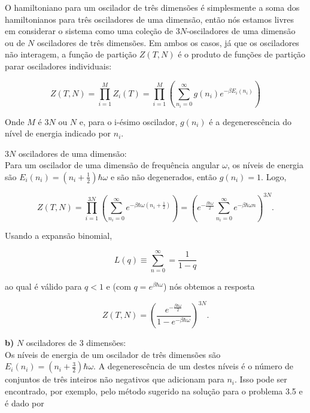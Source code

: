 \documentclass[12pt]{article}
\begin{document}
O hamiltoniano para um oscilador de três dimensões é simplesmente a soma dos hamiltonianos para três osciladores de uma dimensão, então nós estamos livres em considerar o sistema como uma coleção de $3N$-osciladores de uma dimensão ou de $N$ osciladores de três dimensões. Em ambos os casos, já que os osciladores não interagem, a função de partição $Z(T,N)$ é o produto de funções de partição parar osciladores individuais:

\begin{equation}
Z(T,N) = \prod_{i=1}^{M} Z_i(T) = \prod_{i=1}^{M} \left(\sum_{n_i = 0}^\infty g(n_i) e^{-\beta E_i(n_i)}\right)
\end{equation}

Onde $M$ é $3N$ ou $N$ e, para o i-ésimo oscilador, $g(n_i)$ é a degenerescência do nível de energia indicado por $n_i$.

 $3N$ osciladores de uma dimensão:\\

Para um oscilador de uma dimensão de frequência angular $\omega$, os níveis de energia são $E_i(n_i) = \left(n_i +\frac{1}{2}\right)\hbar\omega$ e são não degenerados, então $g(n_i) = 1$. Logo,

\begin{equation}
    Z(T,N) = \prod_{i=1}^{3N} \left(\sum_{n_i =0}^{\infty} e^{-\beta\hbar\omega(n_i+\frac{1}{2})}\right) = \left(e^{-\frac{\beta\hbar\omega}{2}}\sum_{n_i=0}^{\infty} e^{-\beta\hbar\omega n} \right)^{3N} .
\end{equation}

Usando a expansão binomial,

\begin{equation}
    L(q) \equiv \sum_{n=0}^{\infty} = \frac{1}{1-q}
\end{equation}

ao qual é válido para $q<1$ e (com $q=e^{\beta\hbar\omega}$) nós obtemos a resposta

\begin{equation}
Z(T,N) = \left(\frac{e^{-\frac{\beta\hbar\omega}{2}}}{1-e^{-\beta\hbar\omega}}\right)^{3N}.
\end{equation}

\textbf{b)} $N$ osciladores de 3 dimensões:\\

Os níveis de energia de um oscilador de três dimensões são $E_i(n_i) = (n_i + \frac{3}{2})\hbar\omega$. A degenerescência de um destes níveis é o número de conjuntos de três inteiros não negativos que adicionam para $n_i$. Isso pode ser encontrado, por exemplo, pelo método sugerido na solução para o problema 3.5 e é dado por 
\end{document}
